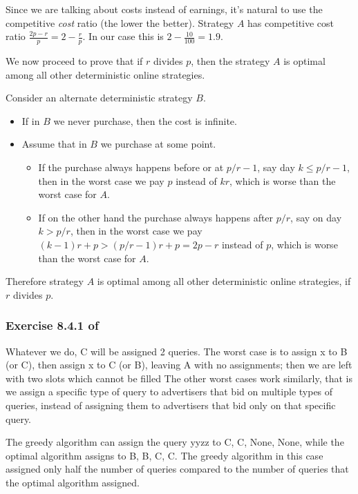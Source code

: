 \documentclass{article}
\begin{document}
Since we are talking about costs instead of earnings,
it's natural to use the competitive \emph{cost} ratio (the lower the better).
Strategy \(A\) has competitive cost ratio \(\frac{2p-r}{p} = 2 - \frac{r}{p}\).
In our case this is \(2 - \frac{10}{100} = 1.9\).

We now proceed to prove that
if \(r\) divides \(p\), then the strategy \(A\) is optimal
among all other deterministic online strategies.

Consider an alternate deterministic strategy \(B\).
\begin{itemize}
    \item If in \(B\) we never purchase,
        then the cost is infinite.
    \item Assume that in \(B\) we purchase at some point.
        \begin{itemize}
            \item If the purchase always happens before or at
                \(p/r - 1\), say day \(k \leq p/r - 1\),
                then in the worst case we pay
                \(p\) instead of \(kr\),
                which is worse than the worst case for \(A\).
            \item If on the other hand the purchase always happens after
                \(p/r\), say on day \(k > p/r\),
                then in the worst case we pay
                \((k-1)r + p > (p/r - 1)r + p = 2p - r \) instead of \(p\),
                which is worse than the worst case for \(A\).
        \end{itemize}
\end{itemize}

Therefore strategy \(A\) is optimal among all other
deterministic online strategies, if \(r\) divides \(p\).


\subsubsection*{Exercise 8.4.1 of \cite{mmds}}
 
Whatever we do, C will be assigned 2 queries.
The worst case is to assign x to B (or C), then assign x to C (or B),
leaving A with no assignments;
then we are left with two slots which cannot be filled
The other worst cases work similarly,
that is we assign a specific type of query
to advertisers that bid on multiple types of queries,
instead of assigning them to advertisers that bid only on that specific query.

The greedy algorithm can assign the query yyzz to C, C, None, None,
while the optimal algorithm assigns to B, B, C, C.
The greedy algorithm in this case assigned only half the number of queries
compared to the number of queries that the optimal algorithm assigned.
\end{document}
